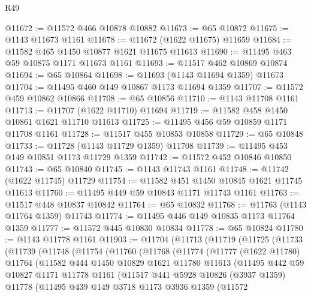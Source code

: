 \begin{lexlean}{R49}
\begin{coremodule}
@11672 := @11572 @466 @10878 @10882
@11673 := @65 @10872
@11675 := @1143 @11673 @1161
@11678 := @11672 (@1622 @11675) @11659
@11684 := @11582 @465 @1450 @10877 @1621 @11675 @11613
@11690 := @11495 @463 @59 @10875 @1171 @11673 @1161
@11693 := @11517 @462 @10869 @10874
@11694 := @65 @10864
@11698 := @11693 (@1143 @11694 @1359) @11673
@11704 := @11495 @460 @149 @10867 @1173 @11694 @1359
@11707 := @11572 @459 @10862 @10866
@11708 := @65 @10856
@11710 := @1143 @11708 @1161
@11713 := @11707 (@1622 @11710) @11694
@11719 := @11582 @458 @1450 @10861 @1621 @11710 @11613
@11725 := @11495 @456 @59 @10859 @1171 @11708 @1161
@11728 := @11517 @455 @10853 @10858
@11729 := @65 @10848
@11733 := @11728 (@1143 @11729 @1359) @11708
@11739 := @11495 @453 @149 @10851 @1173 @11729 @1359
@11742 := @11572 @452 @10846 @10850
@11743 := @65 @10840
@11745 := @1143 @11743 @1161
@11748 := @11742 (@1622 @11745) @11729
@11754 := @11582 @451 @1450 @10845 @1621 @11745 @11613
@11760 := @11495 @449 @59 @10843 @1171 @11743 @1161
@11763 := @11517 @448 @10837 @10842
@11764 := @65 @10832
@11768 := @11763 (@1143 @11764 @1359) @11743
@11774 := @11495 @446 @149 @10835 @1173 @11764 @1359
@11777 := @11572 @445 @10830 @10834
@11778 := @65 @10824
@11780 := @1143 @11778 @1161
@11903 := @11704
    (@11713
      (@11719
        (@11725
          (@11733
            (@11739
              (@11748
                (@11754
                  (@11760
                    (@11768
                      (@11774
                        (@11777
                          (@1622 @11780)
                          @11764
                          (@11582
                            @444
                            @1450
                            @10829
                            @1621
                            @11780
                            @11613
                            (@11495
                              @442
                              @59
                              @10827
                              @1171
                              @11778
                              @1161
                              (@11517
                                @441
                                @5928
                                @10826
                                (@3937 @1359)
                                @11778
                                (@11495
                                  @439
                                  @149
                                  @3718
                                  @1173
                                  @3936
                                  @1359
                                  (@11572

\end{coremodule}
\end{lexlean}
